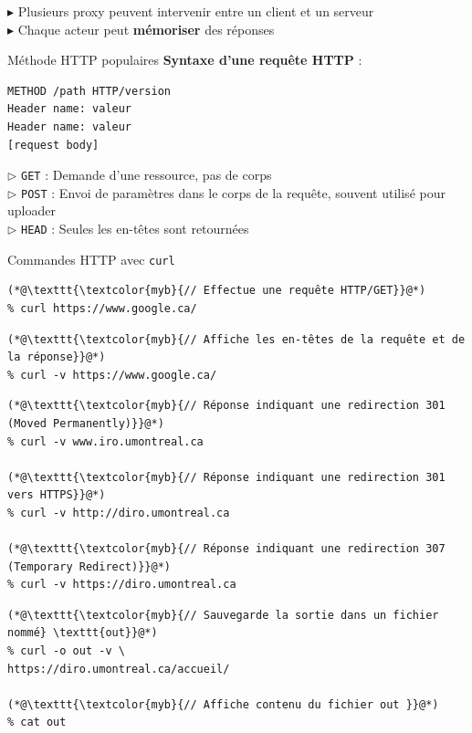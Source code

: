 \documentclass{report}
\begin{document}
\begin{multicols*}{3}
$\blacktriangleright$ Plusieurs proxy peuvent intervenir entre un client et un serveur \\

$\blacktriangleright$ Chaque acteur peut \textbf{mémoriser} des réponses


\begin{Concept}{Méthode HTTP populaires}{}
\textbf{Syntaxe d'une requête HTTP} : 
\begin{verbatim}
METHOD /path HTTP/version
Header name: valeur
Header name: valeur
[request body]
\end{verbatim}

$\rhd$ \texttt{GET} : Demande d’une ressource, pas de corps \\
$\rhd$ \texttt{POST} : Envoi de paramètres dans le corps de la requête, souvent utilisé pour uploader \\
$\rhd$ \texttt{HEAD} : Seules les en-têtes sont retournées   
\end{Concept}



\begin{EExample}{Commandes HTTP avec \texttt{curl}  }{}
\begin{lstlisting}
(*@\texttt{\textcolor{myb}{// Effectue une requête HTTP/GET}}@*)
% curl https://www.google.ca/
\end{lstlisting}

\begin{lstlisting}
(*@\texttt{\textcolor{myb}{// Affiche les en-têtes de la requête et de la réponse}}@*)
% curl -v https://www.google.ca/
\end{lstlisting}


\begin{lstlisting}
(*@\texttt{\textcolor{myb}{// Réponse indiquant une redirection 301 (Moved Permanently)}}@*)
% curl -v www.iro.umontreal.ca

(*@\texttt{\textcolor{myb}{// Réponse indiquant une redirection 301 vers HTTPS}}@*)
% curl -v http://diro.umontreal.ca

(*@\texttt{\textcolor{myb}{// Réponse indiquant une redirection 307 (Temporary Redirect)}}@*)
% curl -v https://diro.umontreal.ca
\end{lstlisting}


\begin{lstlisting}
(*@\texttt{\textcolor{myb}{// Sauvegarde la sortie dans un fichier nommé} \texttt{out}}@*)
% curl -o out -v \ 
https://diro.umontreal.ca/accueil/

(*@\texttt{\textcolor{myb}{// Affiche contenu du fichier out }}@*)
% cat out
\end{lstlisting}


\end{EExample}
\end{multicols*}
\end{document}
